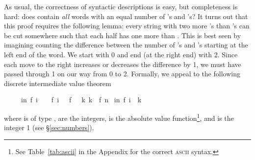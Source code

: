 \begin{isabellebody}
\begin{isamarkuptext}
As usual, the correctness of syntactic descriptions is easy, but completeness
is hard: does  contain \emph{all} words with an equal number of
's and 's? It turns out that this proof requires the
following lemma: every string with two more 's than 's can be cut somewhere such that each half has one more  than
. This is best seen by imagining counting the difference between the
number of 's and 's starting at the left end of the
word. We start with 0 and end (at the right end) with 2. Since each move to the
right increases or decreases the difference by 1, we must have passed through
1 on our way from 0 to 2. Formally, we appeal to the following discrete
intermediate value theorem 
\begin{isabelle}%
\ \ \ \ \ {\isasymlbrakk}{\isasymforall}i{\isacharless}n{\isachardot}\ {\isasymbar}f\ {\isacharparenleft}i\ {\isacharplus}\ {}{\isacharparenright}\ {\isacharminus}\ f\ i{\isasymbar}\ {\isasymle}\ {}{\isacharsemicolon}\ f\ {}\ {\isasymle}\ k{\isacharsemicolon}\ k\ {\isasymle}\ f\ n{\isasymrbrakk}\isanewline
\isaindent{\ \ \ \ \ }{\isasymLongrightarrow}\ {\isasymexists}i{\isasymle}n{\isachardot}\ f\ i\ {\isacharequal}\ k%
\end{isabelle}
where  is of type ,  are the integers,
\isa{{\isasymbar}{\isachardot}{\isasymbar}} is the absolute value function\footnote{See
Table~\ref{tab:ascii} in the Appendix for the correct \textsc{ascii}
syntax.}, and  is the integer 1 (see \S\ref{sec:numbers}).


\end{isamarkuptext}
\end{isabellebody}
